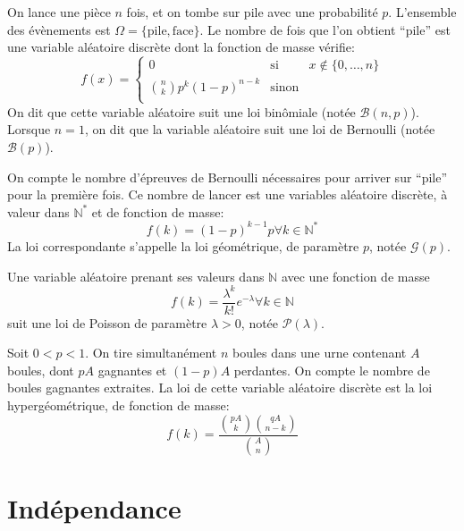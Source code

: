 \documentclass[]{book}
\theoremstyle{definition}
\theoremstyle{definition}
\theoremstyle{definition}
\theoremstyle{remark}
\let\BeginKnitrBlock\begin \let\EndKnitrBlock\end
\begin{document}
\BeginKnitrBlock{example}
\protect\hypertarget{exm:unnamed-chunk-4}{}{\label{exm:unnamed-chunk-4} }On lance une pièce \(n\) fois, et on tombe sur pile avec une probabilité \(p\).
L'ensemble des évènements est \(\Omega = \lbrace \mbox{pile}, \mbox{face} \rbrace\).
Le nombre de fois que l'on obtient ``pile'' est une variable aléatoire discrète dont la fonction de masse vérifie:
\[
  f(x) = \left\lbrace
\begin{array}{ccc}
0  & \mbox{si} & x\notin \lbrace 0, \ldots , n \rbrace\\
\binom{n}{k} p^k (1-p)^{n-k} & \mbox{sinon} &\\
\end{array}\right.
\]
On dit que cette variable aléatoire suit une loi binômiale (notée \(\mathcal{B}(n,p)\)).\\
Lorsque \(n=1\), on dit que la variable aléatoire suit une loi de Bernoulli (notée \(\mathcal{B}(p)\)).
\EndKnitrBlock{example}

\BeginKnitrBlock{example}
\protect\hypertarget{exm:unnamed-chunk-5}{}{\label{exm:unnamed-chunk-5} }On compte le nombre d'épreuves de Bernoulli nécessaires pour arriver sur ``pile'' pour la première fois. Ce nombre de lancer est une variables aléatoire discrète, à valeur dans \(\mathbb{N}^*\) et de fonction de masse:
\[
f(k) = (1-p)^{k-1} p \forall k \in \mathbb{N}^*
\]
La loi correspondante s'appelle la loi géométrique, de paramètre \(p\), notée \(\mathcal{G}(p)\).
\EndKnitrBlock{example}

\BeginKnitrBlock{example}
\protect\hypertarget{exm:unnamed-chunk-6}{}{\label{exm:unnamed-chunk-6} }Une variable aléatoire prenant ses valeurs dans \(\mathbb{N}\) avec une fonction de masse \[
  f(k) = \frac{\lambda^k}{k!} e^{-\lambda} \forall k \in \mathbb{N}\]
suit une loi de Poisson de paramètre \(\lambda >0\), notée \(\mathcal{P}(\lambda)\).
\EndKnitrBlock{example}

\BeginKnitrBlock{example}
\protect\hypertarget{exm:unnamed-chunk-7}{}{\label{exm:unnamed-chunk-7} }Soit \(0<p<1\). On tire simultanément \(n\) boules dans une urne contenant \(A\) boules, dont \(pA\) gagnantes et \((1-p)A\) perdantes. On compte le nombre de boules gagnantes extraites. La loi de cette variable aléatoire discrète est la loi hypergéométrique, de fonction de masse:
\[
  f(k) = \frac{\binom{pA}{k} \binom{qA}{n-k}}{\binom{A}{n}}
  \]
\EndKnitrBlock{example}

\hypertarget{induxe9pendance-1}{%
\section{Indépendance}\label{induxe9pendance-1}}
\end{document}
